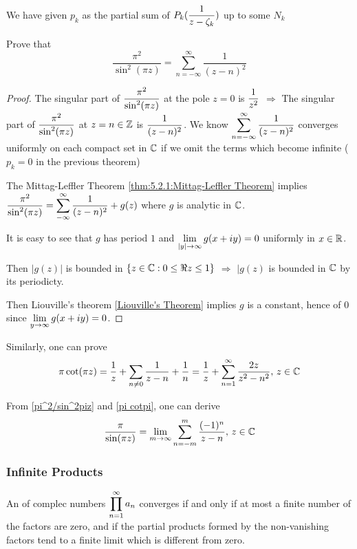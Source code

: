 \begin{remark}
    We have given  $ p_k $ as the partial sum of  $ \displaystyle P_k(\frac{1}{z-\zeta_k}) $ up to some  $ N_k $   
\end{remark}
\begin{example}
    Prove that 
    \begin{equation}\label{pi^2/sin^2piz}
        \frac{\pi^2}{\sin^2(\pi z)}=\sum_{n=-\infty}^\infty\frac{1}{(z-n)^2}    
    \end{equation}
\end{example}
\begin{proof}
    The singular part of  $ \displaystyle\frac{\pi^2}{\sin^2(\pi z)} $ at the pole  $ z=0 $ is  $ \displaystyle\frac{1}{z^2} $ $ \Rightarrow  $ The singular part
    of  $ \displaystyle\frac{\pi^2}{\sin^2(\pi z)} $    at  $ z=n\in\mathbb Z $ is  $ \displaystyle\frac{1}{(z-n)^2}$. We know  $ \displaystyle\sum_{n=-\infty}^\infty\frac{1}{(z-n)^2} $
    converges uniformly on each compact set in  $ \mathbb C  $ if we omit the terms which become infinite (\ie  $ p_k =0 $ in the previous theorem)
    
    The Mittag-Leffler Theorem \ref{thm:5.2.1:Mittag-Leffler Theorem} implies  $ \displaystyle\frac{\pi^2}{\sin^2(\pi z)}=\displaystyle\sum_{-\infty}^\infty \frac{1}{(z-n)^2}+g(z) $ 
    where  $ g  $ is analytic in  $ \mathbb C $.
    
    It is easy to see that  $  g  $ has period  $ 1  $ and  $ \displaystyle\lim_{|y|\to\infty}g(x+iy)=0 $ uniformly in  $ x\in \mathbb R $.
    
    Then  $ |g(z)| $ is bounded in  $ \{z\in \mathbb C:0 \leq \Re z \leq 1\} $ $ \Rightarrow  $  $ |g(z) $ is bounded in  $ \mathbb C $ by its periodicty.
    
    Then Liouville's theorem \ref{Liouville's Theorem} implies  $ g  $ is a constant, hence of  $ 0  $ since  $ \displaystyle\lim_{y\to\infty}g(x+iy)=0 $. 
\end{proof}
Similarly, one can prove 
\begin{equation}\label{pi cotpi}
    \pi\cot(\pi z)=\frac{1}{z}+\sum_{n\neq 0}\frac{1}{z-n}+\frac{1}{n}=\frac{1}{z}+\sum_{n=1}^\infty\frac{2z}{z^2-n^2},\,z\in \mathbb C
\end{equation}

From  \eqref{pi^2/sin^2piz} and \eqref{pi cotpi}, one can derive 
\begin{equation}
    \frac{\pi}{\sin(\pi z)}=\lim_{m\to\infty}\sum_{n=-m}^m\frac{(-1)^n}{z-n},\,z\in\mathbb C
\end{equation}
\subsubsection{Infinite Products}
An  of complec numbers  $ \displaystyle\prod_{n=1}^\infty a_n $ converges if and only if at most a finite number of the factors are zero,
and if the partial products formed by the non-vanishing factors tend to a finite limit which is different from zero. 

